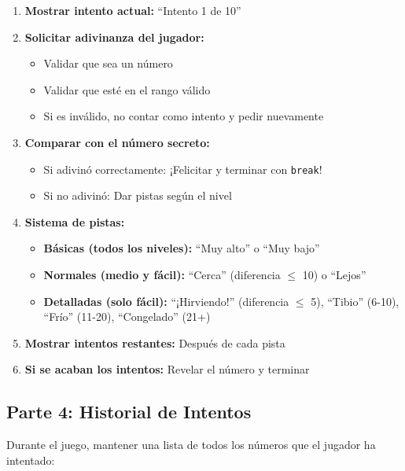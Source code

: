 \documentclass[12pt,a4paper]{article}
\begin{document}
\begin{enumerate}[leftmargin=*]
    \item \textbf{Mostrar intento actual:} ``Intento 1 de 10''
    
    \item \textbf{Solicitar adivinanza del jugador:}
    \begin{itemize}
        \item Validar que sea un número
        \item Validar que esté en el rango válido
        \item Si es inválido, no contar como intento y pedir nuevamente
    \end{itemize}
    
    \item \textbf{Comparar con el número secreto:}
    \begin{itemize}
        \item Si adivinó correctamente: ¡Felicitar y terminar con \texttt{break}!
        \item Si no adivinó: Dar pistas según el nivel
    \end{itemize}
    
    \item \textbf{Sistema de pistas:}
    \begin{itemize}
        \item \textbf{Básicas (todos los niveles):} ``Muy alto'' o ``Muy bajo''
        \item \textbf{Normales (medio y fácil):} ``Cerca'' (diferencia $\leq$ 10) o ``Lejos''
        \item \textbf{Detalladas (solo fácil):} ``¡Hirviendo!'' (diferencia $\leq$ 5), ``Tibio'' (6-10), ``Frío'' (11-20), ``Congelado'' (21+)
    \end{itemize}
    
    \item \textbf{Mostrar intentos restantes:} Después de cada pista
    
    \item \textbf{Si se acaban los intentos:} Revelar el número y terminar
\end{enumerate}

\subsection{Parte 4: Historial de Intentos}

Durante el juego, mantener una lista de todos los números que el jugador ha intentado:
\end{document}
